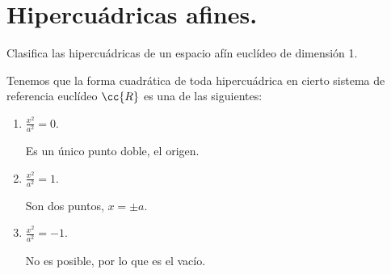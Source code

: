 \section{Hipercuádricas afines.}\label{Rel:Tema3}


\begin{ejercicio}\label{ej:5.3.1}
    Clasifica las hipercuádricas de un espacio afín euclídeo de dimensión 1.

    Tenemos que la forma cuadrática de toda hipercuádrica en cierto sistema de referencia euclídeo $\cc{R}$ es una de las siguientes:
    \begin{enumerate}
        \item $\frac{x^2}{a^2}=0$.

        Es un único punto doble, el origen.

        
        \item $\frac{x^2}{a^2}=1$.

        Son dos puntos, $x=\pm a$.
        
        \item $\frac{x^2}{a^2}=-1$.
        
        No es posible, por lo que es el vacío.
    \end{enumerate}
\end{ejercicio}


